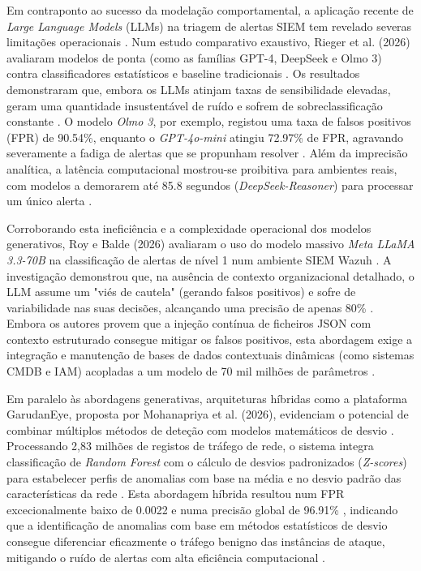 \documentclass[12pt,a4paper]{article}
\begin{document}
Em contraponto ao sucesso da modelação comportamental, a aplicação recente de \textit{Large Language Models} (LLMs) na triagem de alertas SIEM tem revelado severas limitações operacionais \cite{rieger2026}. Num estudo comparativo exaustivo, Rieger et al. (2026) avaliaram modelos de ponta (como as famílias GPT-4, DeepSeek e Olmo 3) contra classificadores estatísticos e baseline tradicionais \cite{rieger2026}. Os resultados demonstraram que, embora os LLMs atinjam taxas de sensibilidade elevadas, geram uma quantidade insustentável de ruído e sofrem de sobreclassificação constante \cite{rieger2026}. O modelo \textit{Olmo 3}, por exemplo, registou uma taxa de falsos positivos (FPR) de 90.54\%, enquanto o \textit{GPT-4o-mini} atingiu 72.97\% de FPR, agravando severamente a fadiga de alertas que se propunham resolver \cite{rieger2026}. Além da imprecisão analítica, a latência computacional mostrou-se proibitiva para ambientes reais, com modelos a demorarem até 85.8 segundos (\textit{DeepSeek-Reasoner}) para processar um único alerta \cite{rieger2026}.

Corroborando esta ineficiência e a complexidade operacional dos modelos generativos, Roy e Balde (2026) avaliaram o uso do modelo massivo \textit{Meta LLaMA 3.3-70B} na classificação de alertas de nível 1 num ambiente SIEM Wazuh \cite{roy2026}. A investigação demonstrou que, na ausência de contexto organizacional detalhado, o LLM assume um "viés de cautela" (gerando falsos positivos) e sofre de variabilidade nas suas decisões, alcançando uma precisão de apenas 80\% \cite{roy2026}. Embora os autores provem que a injeção contínua de ficheiros JSON com contexto estruturado consegue mitigar os falsos positivos, esta abordagem exige a integração e manutenção de bases de dados contextuais dinâmicas (como sistemas CMDB e IAM) acopladas a um modelo de 70 mil milhões de parâmetros \cite{roy2026}. 

Em paralelo às abordagens generativas, arquiteturas híbridas como a plataforma GarudanEye, proposta por Mohanapriya et al. (2026), evidenciam o potencial de combinar múltiplos métodos de deteção com modelos matemáticos de desvio \cite{mohanapriya2026}. Processando 2,83 milhões de registos de tráfego de rede, o sistema integra classificação de \textit{Random Forest} com o cálculo de desvios padronizados (\textit{Z-scores}) para estabelecer perfis de anomalias com base na média e no desvio padrão das características da rede \cite{mohanapriya2026}. Esta abordagem híbrida resultou num FPR excecionalmente baixo de 0.0022 e numa precisão global de 96.91\% \cite{mohanapriya2026}, indicando que a identificação de anomalias com base em métodos estatísticos de desvio consegue diferenciar eficazmente o tráfego benigno das instâncias de ataque, mitigando o ruído de alertas com alta eficiência computacional \cite{mohanapriya2026}.
\end{document}
